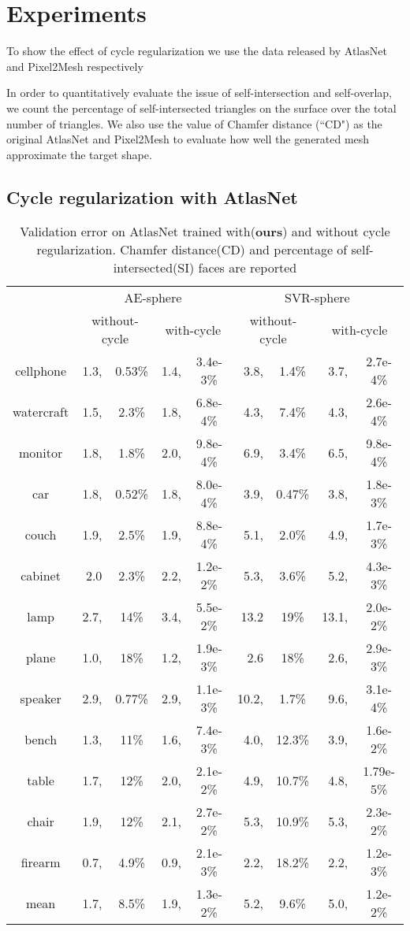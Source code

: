 \section{Experiments}

 To show the effect of cycle regularization we use the data released by AtlasNet and Pixel2Mesh respectively \cite{3DR2N2}

In order to quantitatively evaluate the issue of self-intersection and self-overlap, we count the percentage of self-intersected triangles on the surface over the total number of triangles. We also use the value of Chamfer distance (``CD") as the original AtlasNet and Pixel2Mesh to evaluate how well the generated mesh approximate the target shape.
\subsection{Cycle regularization with AtlasNet}

\begin{table*}
	\caption{Validation error on AtlasNet trained with(\textbf{ours}) and without cycle regularization. Chamfer distance(CD) and percentage of self-intersected(SI) faces are reported}
	\label{tab:seg}
	\centering
	\begin{tabular}{c|rc|rc|rc|rc|}
    \multirow{2}{*}{~} &\multicolumn{4}{c|}{AE-sphere}&\multicolumn{4}{c}{SVR-sphere}\\
	\cline{2-9}
	~& \multicolumn{2}{c|}{without-cycle} & \multicolumn{2}{c|}{with-cycle} & \multicolumn{2}{c|}{without-cycle} & \multicolumn{2}{c|}{with-cycle} \\
	\hline
	cellphone&1.3,&0.53\%&1.4,&3.4e-3\%&3.8,&1.4\%&3.7,&2.7e-4\%\\
	watercraft&1.5,&2.3\%&1.8,&6.8e-4\%&4.3,&7.4\%&4.3,&2.6e-4\%\\
	monitor&1.8,&1.8\%&2.0,&9.8e-4\%&6.9,&3.4\%&6.5,&9.8e-4\%\\
	car&1.8,&0.52\%&1.8,&8.0e-4\%&3.9,&0.47\%&3.8,&1.8e-3\%\\
	couch&1.9,&2.5\%&1.9,&8.8e-4\%&5.1,&2.0\%&4.9,&1.7e-3\%\\
	cabinet&2.0&2.3\%&2.2,&1.2e-2\%&5.3,&3.6\%&5.2,&4.3e-3\%\\
	lamp&2.7,&14\%&3.4,&5.5e-2\%&13.2&19\%&13.1,&2.0e-2\%\\
	plane&1.0,&18\%&1.2,&1.9e-3\%&2.6&18\%&2.6,&2.9e-3\%\\
	speaker&2.9,&0.77\%&2.9,&1.1e-3\%&10.2,&1.7\%&9.6,&3.1e-4\%\\
	bench&1.3,&11\%&1.6,&7.4e-3\%&4.0,&12.3\%&3.9,&1.6e-2\%\\
	table&1.7,&12\%&2.0,&2.1e-2\%&4.9,&10.7\%&4.8,&1.79e-5\%\\
	chair&1.9,&12\%&2.1,&2.7e-2\%&5.3,&10.9\%&5.3,&2.3e-2\%\\
	firearm&0.7,&4.9\%&0.9,&2.1e-3\%&2.2,&18.2\%&2.2,&1.2e-3\%\\
	\hline
	mean &1.7,&8.5\%&1.9,& 1.3e-2\% &5.2,&9.6\%&5.0,&1.2e-2\%\\
		
	\end{tabular}
\end{table*}
		
